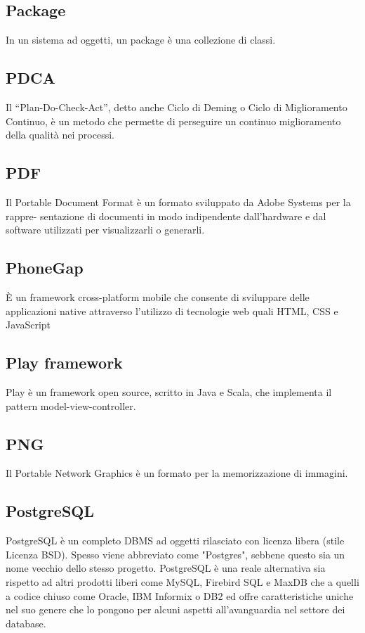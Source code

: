 \subsection*{Package}
In un sistema ad oggetti, un package è una collezione di classi.

\subsection*{PDCA}
Il “Plan-Do-Check-Act”, detto anche Ciclo di Deming o Ciclo di Miglioramento Continuo,
è un metodo che permette di perseguire un continuo miglioramento della qualità nei processi.

\subsection*{PDF}
Il Portable Document Format è un formato sviluppato da Adobe Systems per la rappre-
sentazione di documenti in modo indipendente dall’hardware e dal software utilizzati per
visualizzarli o generarli.

\subsection*{PhoneGap}
È un framework cross-platform mobile che consente di sviluppare delle applicazioni native attraverso l'utilizzo di tecnologie web quali HTML, CSS e JavaScript

\subsection*{Play framework}
Play è un framework open source, scritto in Java e Scala, che implementa il pattern model-view-controller.

\subsection*{PNG}
Il Portable Network Graphics è un formato per la memorizzazione di immagini.

\subsection*{PostgreSQL}
PostgreSQL è un completo DBMS ad oggetti rilasciato con licenza libera (stile Licenza BSD). Spesso viene abbreviato come "Postgres", sebbene questo sia un nome vecchio dello stesso progetto. PostgreSQL è una reale alternativa sia rispetto ad altri prodotti liberi come MySQL, Firebird SQL e MaxDB che a quelli a codice chiuso come Oracle, IBM Informix o DB2 ed offre caratteristiche uniche nel suo genere che lo pongono per alcuni aspetti all'avanguardia nel settore dei database.

